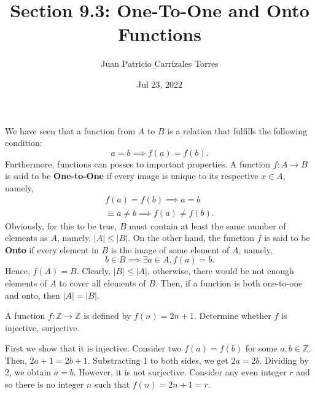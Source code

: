 \documentclass[12pt]{article}
\newcommand{\Z}{\mathbb{Z}}
\newenvironment{problem}[2][Problem]{\begin{trivlist} \item[\hskip \labelsep {\bfseries #1}\hskip \labelsep {\bfseries #2.}]}{\end{trivlist}}
\newenvironment{solution}[1][Solution]{\begin{trivlist} \item[\hskip \labelsep {\bfseries #1}]}{\end{trivlist}}
\begin{document}
  
 \title{Section 9.3: One-To-One and Onto Functions}
   \author{Juan Patricio Carrizales Torres}
     \date{Jul 23, 2022}
       \maketitle
  We have seen that a function from $A$ to $B$ is a relation that fulfills the following condition:      
    \begin{equation*}
      a=b \implies f(a)=f(b).
    \end{equation*}
  Furthermore, functions can posses to important properties. A function $f:A\to B$ is said to be \textbf{One-to-One} if every image is unique to its respective $x\in A$, namely,
    \begin{align*}
      f(a)=f(b) \implies a=b\\
      \equiv a\neq b \implies f(a)\neq f(b).
    \end{align*}
 Obviously, for this to be true, $B$ must contain at least the same number of elements as $A$, namely, $|A|\leq |B|$. On the other hand, the function $f$ is said to be \textbf{Onto} if every element in $B$ is the image of some element of $A$, namely,
    \begin{equation*}
      b\in B \implies \exists a\in A, f(a)=b.
    \end{equation*}
    Hence, $f(A)=B$. Clearly, $|B|\leq |A|$, otherwise, there would be not enough elements of $A$ to cover all elements of $B$. Then, if a function is both one-to-one and onto, then $|A|=|B|$.
    \begin{problem}{20}
      A function $f:\Z \to \Z$ is defined by $f(n)=2n+1$. Determine whether $f$ is injective, surjective. 
    \begin{solution}
      First we show that it is injective. Consider two $f(a)=f(b)$ for some $a,b\in \Z$. Then, $2a+1=2b+1$. Substracting 1 to both sides, we get $2a=2b$. Dividing by 2, we obtain $a=b$. However, it is not surjective. Consider any even integer $r$ and so there is no integer $n$ such that $f(n)=2n+1=r$.
    \end{solution}
    \end{problem}
\end{document}
